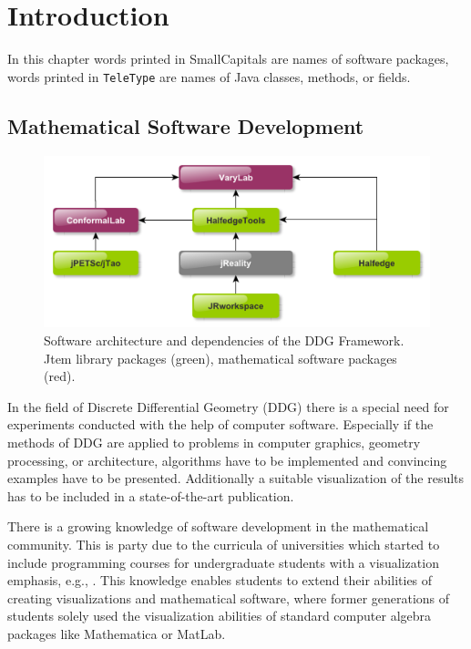 \chapter{Introduction}

In this chapter words printed in {\sc SmallCapitals} are names of software packages, words printed
in {\tt TeleType} are names of {\sc Java} classes, methods, or fields.

\section{Mathematical Software Development}

\begin{figure}[h]
	\centering
	\includegraphics[width=\linewidth]{figures/software_architecture}
	\caption[Software package dependencies]{
		Software architecture and dependencies of the DDG Framework. 
		{\sc Jtem} library packages (green), mathematical software packages (red).
	}
	\label{fig:software_architecture}
\end{figure}

In the field of Discrete Differential Geometry (DDG) there is a special need for experiments
conducted with the help of computer software. Especially if the methods of DDG are applied
to problems in computer graphics, geometry processing, or architecture, algorithms have 
to be implemented and convincing examples have to be presented. Additionally a suitable 
visualization of the results has to be included in a state-of-the-art publication.

There is a growing knowledge of software development in the mathematical community. This 
is party due to the curricula of universities which started to include programming courses for 
undergraduate students with a visualization emphasis, e.g., \cite{VisMathHomepage, 
CaltechVisMath}. This knowledge enables students to extend their abilities of creating visualizations and 
mathematical software, where former generations of students solely used the visualization 
abilities of standard computer algebra packages like Mathematica or MatLab.

